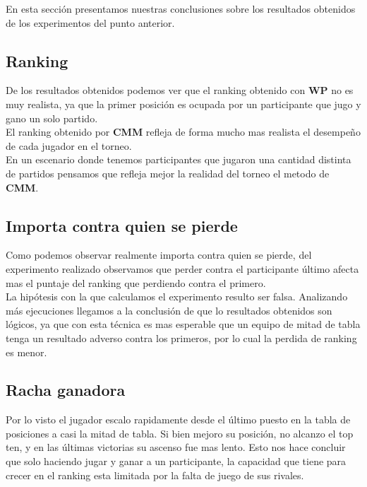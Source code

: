 En esta sección presentamos nuestras conclusiones sobre los resultados obtenidos de los experimentos del punto anterior. \\

\subsection{Ranking}

De los resultados obtenidos podemos ver que el ranking obtenido con \textbf{WP} no es muy realista, ya que la primer posición es ocupada por un participante que jugo y gano un solo partido. \\

El ranking obtenido por \textbf{CMM} refleja de forma mucho mas realista el desempeño de cada jugador en el torneo. \\

En un escenario donde tenemos participantes que jugaron una cantidad distinta de partidos pensamos que refleja mejor la realidad del torneo el metodo de \textbf{CMM}. \\


\subsection{\¿Importa contra quien se pierde\?}

Como podemos observar realmente importa contra quien se pierde, del experimento realizado observamos que perder contra el participante último afecta mas el puntaje del ranking que perdiendo 
contra el primero. \\

La hipótesis con la que calculamos el experimento resulto ser falsa. Analizando más ejecuciones llegamos a la conclusión de que lo resultados obtenidos son lógicos, ya que con esta técnica 
es mas esperable que un equipo de mitad de tabla tenga un resultado adverso contra los primeros, por lo cual la perdida de ranking es menor. \\


\subsection{Racha ganadora}

Por lo visto el jugador escalo rapidamente desde el último puesto en la tabla de posiciones a casi la mitad de tabla. Si bien mejoro su posición, no alcanzo el top ten, y en las últimas victorias su ascenso fue mas lento. Esto nos hace concluir que solo haciendo jugar y ganar a un participante, la capacidad que tiene para crecer en el ranking esta limitada por la falta de juego de sus rivales.

